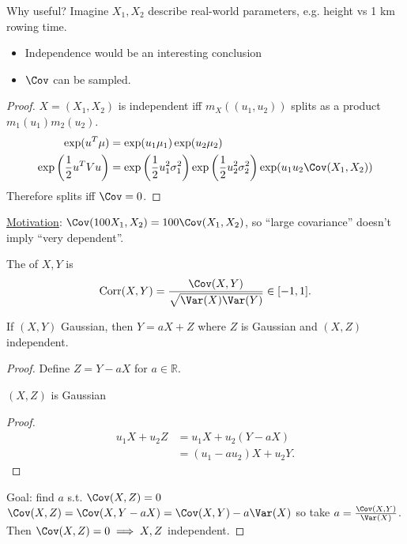 \color{blue}
Why useful?
Imagine $X_1, X_2$ describe real-world parameters, e.g. height vs 1 km rowing time.
\begin{itemize}
    \item Independence would be an interesting conclusion
    \item $\Cov$ can be sampled.
\end{itemize} 
\color{black}

\begin{proof}
    $X = (X_1, X_2)$ is independent iff $m_X \left( (u_1, u_2) \right)$ splits as a product $m_1 (u_1) m_2 (u_2)$.
    \begin{align*}
        \exp(u^T \mu) &= \exp(u_1 \mu_1) \exp(u_2 \mu_2) \\
        \exp\left(\frac{1}{2} u^T V u\right) &= \exp \left( \frac{1}{2} u_1^2 \sigma_1^2 \right) \exp \left( \frac{1}{2} u_2^2 \sigma_2^2 \right) \exp(u_1 u_2 \Cov(X_1, X_2)) 
    \end{align*}
    Therefore splits iff $\Cov = 0$. 
\end{proof} 

\underline{Motivation}: $\Cov(100 X_1, X_2) = 100 \Cov(X_1, X_2)$, so ``large covariance'' doesn't imply ``very dependent''.

\begin{definition}[Correlation]
    The  of $X, Y$ is \begin{align*}
        \operatorname{Corr}(X, Y) = \frac{\Cov(X, Y)}{\sqrt{\Var(X) \Var(Y)}} \in [-1, 1].
    \end{align*} 
\end{definition} 

\begin{proposition}
    If $(X, Y)$ Gaussian, then $Y = aX + Z$ where $Z$ is Gaussian and $(X, Z)$ independent.
\end{proposition} 

\begin{proof}
    Define $Z = Y - aX$ for $a \in \mathbb{R}$.

    \begin{claim}
        $(X, Z)$ is Gaussian
    \end{claim} 
    
    \begin{proof}
        \begin{align*}
            u_1 X + u_2 Z &= u_1 X + u_2 (Y - aX) \\
            &= (u_1 - a u_2) X + u_2 Y.
        \end{align*} 
    \end{proof} 
    
    Goal: find $a$ s.t. $\Cov(X, Z) = 0$
    $\Cov(X, Z) = \Cov(X, Y - aX) = \Cov(X, Y) - a\Var(X)$ so take $a = \frac{\Cov(X, Y)}{\Var(X)}$.
    Then $\Cov(X, Z) = 0 \implies X, Z$ independent.
\end{proof} 

